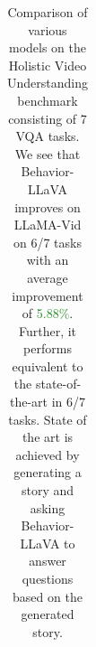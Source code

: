 \begin{table}[!tp]
\begin{adjustbox}{max width=1.0\textwidth}
\begin{tabular}{lllcccccccc}
\bottomrule[1.2pt]
\end{tabular}
\end{adjustbox}
\caption{Comparison of various models on the Holistic Video Understanding benchmark \cite{diba2020large} consisting of 7 VQA tasks. We see that Behavior-LLaVA improves on LLaMA-Vid on 6/7 tasks with an average improvement of \textcolor{ForestGreen}{5.88\%}. Further, it performs equivalent to the state-of-the-art in 6/7 tasks. State of the art is achieved by generating a story and asking Behavior-LLaVA to answer questions based on the generated story.\label{table:hvu-benchmark}}
\end{table}





